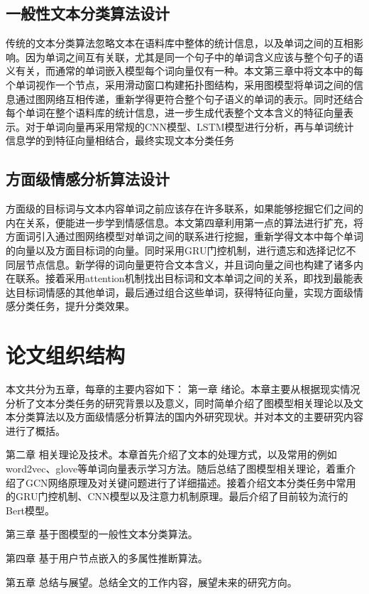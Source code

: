 \subsection{一般性文本分类算法设计}
传统的文本分类算法忽略文本在语料库中整体的统计信息，以及单词之间的互相影响。因为单词之间互有关联，尤其是同一个句子中的单词含义应该与整个句子的语义有关，而通常的单词嵌入模型每个词向量仅有一种。本文第三章中将文本中的每个单词视作一个节点，采用滑动窗口构建拓扑图结构，采用图模型将单词之间的信息通过图网络互相传递，重新学得更符合整个句子语义的单词的表示。同时还结合每个单词在整个语料库的统计信息，进一步生成代表整个文本含义的特征向量表示。对于单词向量再采用常规的CNN模型、LSTM模型进行分析，再与单词统计信息学的到特征向量相结合，最终实现文本分类任务
\subsection{方面级情感分析算法设计}
方面级的目标词与文本内容单词之前应该存在许多联系，如果能够挖掘它们之间的内在关系，便能进一步学到情感信息。本文第四章利用第一点的算法进行扩充，将方面词引入通过图网络模型对单词之间的联系进行挖掘，重新学得文本中每个单词的向量以及方面目标词的向量。同时采用GRU门控机制，进行遗忘和选择记忆不同层节点信息。新学得的词向量更符合文本含义，并且词向量之间也构建了诸多内在联系。接着采用attention机制找出目标词和文本单词之间的关系，即找到最能表达目标词情感的其他单词，最后通过组合这些单词，获得特征向量，实现方面级情感分类任务，提升分类效果。
\section{论文组织结构}
本文共分为五章，每章的主要内容如下：
第一章 绪论。本章主要从根据现实情况分析了文本分类任务的研究背景以及意义，同时简单介绍了图模型相关理论以及文本分类算法以及方面级情感分析算法的国内外研究现状。并对本文的主要研究内容进行了概括。

第二章 相关理论及技术。本章首先介绍了文本的处理方式，以及常用的例如word2vec、glove等单词向量表示学习方法。随后总结了图模型相关理论，着重介绍了GCN网络原理及对关键问题进行了详细描述。接着介绍文本分类任务中常用的GRU门控机制、CNN模型以及注意力机制原理。最后介绍了目前较为流行的Bert模型。

第三章 基于图模型的一般性文本分类算法。

第四章 基于用户节点嵌入的多属性推断算法。

第五章 总结与展望。总结全文的工作内容，展望未来的研究方向。 
